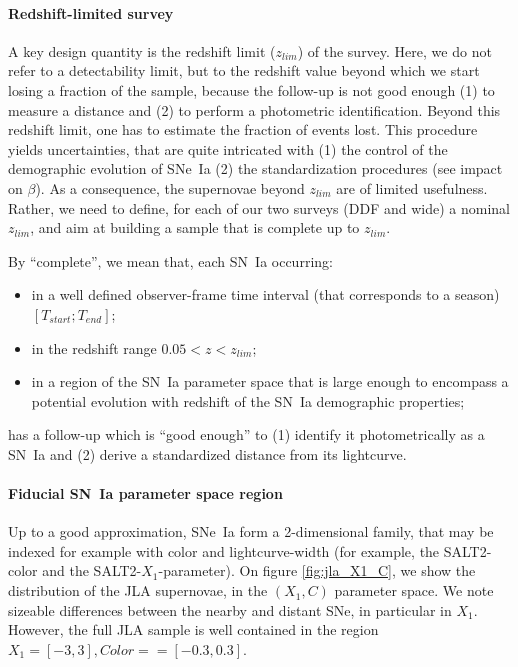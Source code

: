 \documentclass[\docopts]{\docclass}
\begin{document}
\paragraph{Redshift-limited survey} A key design quantity is the
redshift limit ($z_{lim}$) of the survey. Here, we do not refer to a
detectability limit, but to the redshift value beyond which we start
losing a fraction of the sample, because the follow-up is not good
enough (1) to measure a distance and (2) to perform a photometric
identification.  Beyond this redshift limit, one has to estimate the
fraction of events lost. This procedure yields uncertainties, that are
quite intricated with (1) the control of the demographic evolution of
SNe~Ia (2) the standardization procedures (see impact on $\beta$).  As
a consequence, the supernovae beyond $z_{lim}$ are of limited
usefulness.  Rather, we need to define, for each of our two surveys
(DDF and wide) a nominal $z_{lim}$, and aim at building a sample that
is complete up to $z_{lim}$. 

By ``complete'', we mean that, each SN~Ia occurring:
\begin{itemize}
\item in a well defined observer-frame time interval (that corresponds
  to a season) $[T_{start}; T_{end}]$;
\item in the redshift range $0.05 < z < z_{lim}$;
\item in a region of the SN~Ia parameter space that is large enough to
  encompass a potential evolution with redshift of the SN~Ia
  demographic properties;
\end{itemize}
has a follow-up which is ``good enough'' to (1) identify it
photometrically as a SN~Ia and (2) derive a standardized distance from
its lightcurve.

\paragraph{Fiducial SN~Ia parameter space region} Up to a good
approximation, SNe~Ia form a 2-dimensional family, that may be indexed
for example with color and lightcurve-width (for example, the
SALT2-color and the SALT2-$X_1$-parameter).  On figure
\ref{fig:jla_X1_C}, we show the distribution of the JLA supernovae, in
the $(X_1,C)$ parameter space. We note sizeable differences between the
nearby and distant SNe, in particular in $X_1$.  However, the full JLA
sample is well contained in the region $X_1 = [-3,3], Color= = [-0.3,
0.3]$. 
\end{document}
